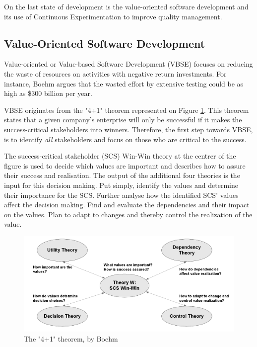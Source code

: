 \documentclass{sig-alternate}
\begin{document}
On the last state of development is the value-oriented software development and its use of Continuous Experimentation to improve quality management. 

\subsection{Value-Oriented Software Development}
\label{vosd}
Value-oriented or Value-based Software Development (VBSE) focuses on reducing the waste of resources on activities with negative return investments. For instance, Boehm \cite{stefan:valuebased} argues that the wasted effort by extensive testing could be as high as \$300 billion per year.

VBSE originates from the "4+1" theorem represented on Figure \ref{fig:fouronetheorem}. This theorem states that a given company's enterprise will only be successful if it makes the success-critical stakeholders into winners. Therefore, the first step towards VBSE, is to identify \textit{all} stakeholders and  focus on those who are critical to the success.

The success-critical stakeholder (SCS) Win-Win theory at the centrer of the figure is used to decide which values are important and describes how to assure their success and realisation. The output of the additional four theories is the input for this decision making. Put simply, identify the values and determine their importance for the SCS. Further analyse how the identified SCS' values affect the decision making. Find and evaluate the dependencies and their impact on the values. Plan to adapt to changes and thereby control the realization of the value\cite{stefan:valuebased}.

\begin{figure}
\centering
\includegraphics[scale=0.6]{Umlet/4+1theorem.png}
\caption{The "4+1" theorem, by Boehm}
\label{fig:fouronetheorem}
\end{figure} 
\end{document}

